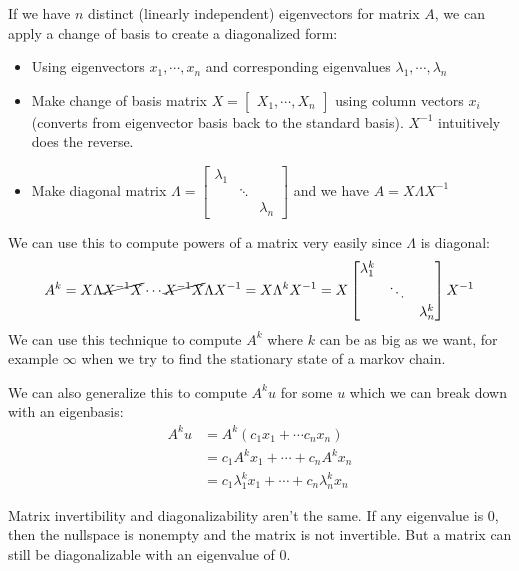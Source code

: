 \documentclass[12pt]{article} %
\begin{document}
If we have $n$ distinct (linearly independent) eigenvectors for matrix $A$, we can apply a change of basis to create a diagonalized form:
\begin{itemize}[topsep=-1pt,itemsep=-1pt]
    \item Using eigenvectors $x_1,\cdots,x_n$ and corresponding eigenvalues $\lambda_1,\cdots,\lambda_n$
    \item Make change of basis matrix $X = \begin{bmatrix}
    X_1,\cdots,X_n
    \end{bmatrix}$ using column vectors $x_i$ (converts from eigenvector basis back to the standard basis). $X^{-1}$ intuitively does the reverse.
    \item Make diagonal matrix $\Lambda = \begin{bmatrix}
    \lambda_1 &&\\
    & \ddots & \\
    &&\lambda_n
    \end{bmatrix}$
    and we have $A = X \Lambda X^{-1}$
\end{itemize}
We can use this to compute powers of a matrix very easily since $\Lambda$ is diagonal:
\begin{equation*}
    A^k = X\Lambda \cancel{X^{-1}X} \cdots \cancel{X^{-1}X}\Lambda X^{-1}   = X\Lambda^kX^{-1} = X
    \begin{bmatrix}
    \lambda_1^k &&\\
    & \ddots & \\
    &&\lambda_n^k
    \end{bmatrix}
    X^{-1}
\end{equation*}
We can use this technique to compute $A^k$ where $k$ can be as big as we want, for example $\infty$ when we try to find the stationary state of a markov chain.

We can also generalize this to compute $A^ku$ for some $u$ which we can break down with an eigenbasis:
\begin{align*}
    A^ku 
    &= A^k(c_1x_1 + \cdots c_nx_n) \\
    &= c_1A^kx_1 + \cdots + c_n A^k x_n \\
    &= c_1 \lambda_1^k x_1 + \cdots + c_n \lambda_n^k x_n
\end{align*}

\vspace{-1em}
\separate

Matrix invertibility and diagonalizability aren't the same. If any eigenvalue is 0, then the nullspace is nonempty and the matrix is not invertible. But a matrix can still be diagonalizable with an eigenvalue of 0.
\end{document}
